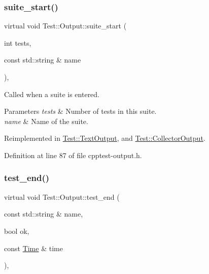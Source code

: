 \subsubsection{\texorpdfstring{suite\+\_\+start()}{suite\_start()}}
{\footnotesize\ttfamily virtual void Test\+::\+Output\+::suite\+\_\+start (\begin{DoxyParamCaption}\item[{int}]{tests,  }\item[{const std\+::string \&}]{name }\end{DoxyParamCaption})\hspace{0.3cm}{\ttfamily [inline]}, {\ttfamily [virtual]}}

Called when a suite is entered.


\begin{DoxyParams}{Parameters}
{\em tests} & Number of tests in this suite. \\
\hline
{\em name} & Name of the suite. \\
\hline
\end{DoxyParams}


Reimplemented in \mbox{\hyperlink{class_test_1_1_text_output_a0b6479918ee7f0501dfcdfcbc7c9d190}{Test\+::\+Text\+Output}}, and \mbox{\hyperlink{class_test_1_1_collector_output_a1d4c1eb5920fa96fb8dc8fe2eb0c336e}{Test\+::\+Collector\+Output}}.



Definition at line 87 of file cpptest-\/output.\+h.

\mbox{\label{class_test_1_1_output_a3796943e3b56373492c957212a21454e}} 
\subsubsection{\texorpdfstring{test\+\_\+end()}{test\_end()}}
{\footnotesize\ttfamily virtual void Test\+::\+Output\+::test\+\_\+end (\begin{DoxyParamCaption}\item[{const std\+::string \&}]{name,  }\item[{bool}]{ok,  }\item[{const \mbox{\hyperlink{class_test_1_1_time}{Time}} \&}]{time }\end{DoxyParamCaption})\hspace{0.3cm}{\ttfamily [inline]}, {\ttfamily [virtual]}}

